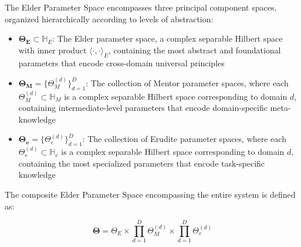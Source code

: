 \begin{definition}
\label{def:elder_parameter_space}
The Elder Parameter Space encompasses three principal component spaces, organized hierarchically according to levels of abstraction:

\begin{itemize}
    \item $\boldsymbol{\Theta_E} \subset \mathbb{H}_E$: The Elder parameter space, a complex separable Hilbert space with inner product $\langle \cdot, \cdot \rangle_E$, containing the most abstract and foundational parameters that encode cross-domain universal principles
    
    \item $\boldsymbol{\Theta_M} = \{\Theta_M^{(d)}\}_{d=1}^D$: The collection of Mentor parameter spaces, where each $\Theta_M^{(d)} \subset \mathbb{H}_M$ is a complex separable Hilbert space corresponding to domain $d$, containing intermediate-level parameters that encode domain-specific meta-knowledge
    
    \item $\boldsymbol{\Theta_e} = \{\Theta_e^{(d)}\}_{d=1}^D$: The collection of Erudite parameter spaces, where each $\Theta_e^{(d)} \subset \mathbb{H}_e$ is a complex separable Hilbert space corresponding to domain $d$, containing the most specialized parameters that encode task-specific knowledge
\end{itemize}

The composite Elder Parameter Space encompassing the entire system is defined as:

\begin{equation}
\boldsymbol{\Theta} = \Theta_E \times \prod_{d=1}^D \Theta_M^{(d)} \times \prod_{d=1}^D \Theta_e^{(d)}
\end{equation}
\end{definition}

